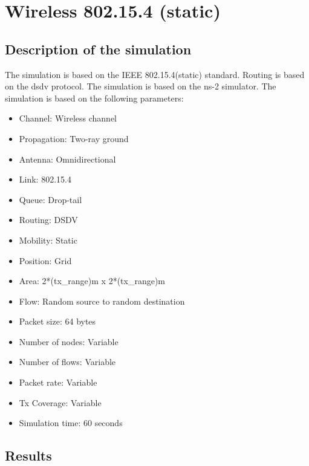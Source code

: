 \section{Wireless 802.15.4 (static)}
\subsection{Description of the simulation}
The simulation is based on the IEEE 802.15.4(static) standard. Routing is based on the dsdv protocol. The simulation is based on the ns-2 simulator. The simulation is based on the following parameters:
\begin{itemize}
    \item Channel: Wireless channel
    \item Propagation: Two-ray ground
    \item Antenna: Omnidirectional
    \item Link: 802.15.4
    \item Queue: Drop-tail
    \item Routing: DSDV
    \item Mobility: Static
    \item Position: Grid
    \item Area: 2*(tx\_range)m x 2*(tx\_range)m
    \item Flow: Random source to random destination
    \item Packet size: 64 bytes
    \item Number of nodes: Variable
    \item Number of flows: Variable
    \item Packet rate: Variable
    \item Tx Coverage: Variable
    \item Simulation time: 60 seconds
\end{itemize}

\subsection{Results}
